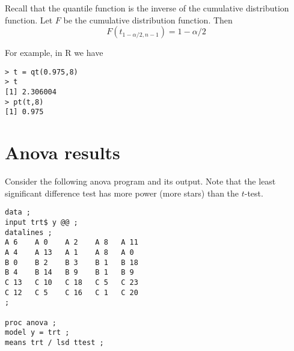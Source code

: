 \documentclass[12pt]{article}
\begin{document}
Recall that the quantile function
is the inverse of the cumulative
distribution function.
Let $F$ be the cumulative distribution function.
Then
\[
F(t_{1-\alpha/2,n-1})=1-\alpha/2
\]

For example, in R we have

{\footnotesize\begin{verbatim}
> t = qt(0.975,8)
> t
[1] 2.306004
> pt(t,8)
[1] 0.975
\end{verbatim}}

\newpage

\section{Anova results}

Consider the following anova program and its output.
Note that the least significant difference test has more power (more stars) than the $t$-test.

{\footnotesize\begin{verbatim}
data ;
input trt$ y @@ ;
datalines ;
A 6    A 0    A 2    A 8   A 11
A 4    A 13   A 1    A 8   A 0
B 0    B 2    B 3    B 1   B 18
B 4    B 14   B 9    B 1   B 9
C 13   C 10   C 18   C 5   C 23
C 12   C 5    C 16   C 1   C 20
;

proc anova ;
model y = trt ;
means trt / lsd ttest ;
\end{verbatim}}
\end{document}
